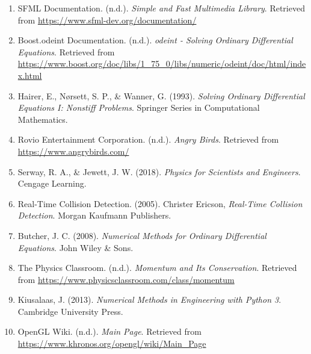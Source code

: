\documentclass[12pt]{article}
\begin{document}
\begin{enumerate}
    \item SFML Documentation. (n.d.). \textit{Simple and Fast Multimedia Library}. Retrieved from \url{https://www.sfml-dev.org/documentation/}
    \item Boost.odeint Documentation. (n.d.). \textit{odeint - Solving Ordinary Differential Equations}. Retrieved from \url{https://www.boost.org/doc/libs/1_75_0/libs/numeric/odeint/doc/html/index.html}
    \item Hairer, E., Nørsett, S. P., \& Wanner, G. (1993). \textit{Solving Ordinary Differential Equations I: Nonstiff Problems}. Springer Series in Computational Mathematics.
    \item Rovio Entertainment Corporation. (n.d.). \textit{Angry Birds}. Retrieved from \url{https://www.angrybirds.com/}
    \item Serway, R. A., \& Jewett, J. W. (2018). \textit{Physics for Scientists and Engineers}. Cengage Learning.
    \item Real-Time Collision Detection. (2005). Christer Ericson, \textit{Real-Time Collision Detection}. Morgan Kaufmann Publishers.
    \item Butcher, J. C. (2008). \textit{Numerical Methods for Ordinary Differential Equations}. John Wiley \& Sons.
    \item The Physics Classroom. (n.d.). \textit{Momentum and Its Conservation}. Retrieved from \url{https://www.physicsclassroom.com/class/momentum}
    \item Kiusalaas, J. (2013). \textit{Numerical Methods in Engineering with Python 3}. Cambridge University Press.
    \item OpenGL Wiki. (n.d.). \textit{Main Page}. Retrieved from \url{https://www.khronos.org/opengl/wiki/Main_Page}
\end{enumerate}
\end{document}

